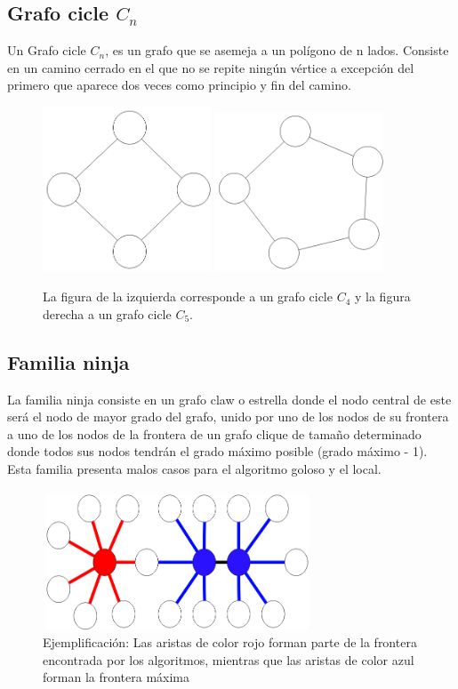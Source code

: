 \subsection{Grafo cicle $C_n$}
Un Grafo cicle $C_n$, es un grafo que se asemeja a un polígono de n lados. Consiste en un camino cerrado en el que no se repite ningún vértice a excepción del primero que aparece dos veces como principio y fin del camino. 

\begin{figure}[H]
\centering
\includegraphics[width=50mm]{C_4.png}
\includegraphics[width=50mm]{C_5.png}
\caption{La figura de la izquierda corresponde a un grafo cicle $C_4$ y la figura derecha a un grafo cicle $C_5$.}
\label{overflow}
\end{figure}

\subsection{Familia ninja}
La familia ninja consiste en un grafo claw o estrella donde el nodo central de este será el nodo de mayor grado del grafo, unido por uno de los nodos de su frontera a uno de los nodos de la frontera de un grafo clique de tamaño determinado donde todos sus nodos tendrán el grado máximo posible (grado máximo - 1). Esta familia presenta malos casos para el algoritmo goloso y el local.

\begin{figure}[H]
\centering
\includegraphics[width=80mm]{ejemploErrorGoloso.png}
\caption{Ejemplificación: Las aristas de color rojo forman parte de la frontera encontrada por los algoritmos, mientras que las aristas de color azul forman la frontera máxima}
\label{overflow}
\end{figure}

